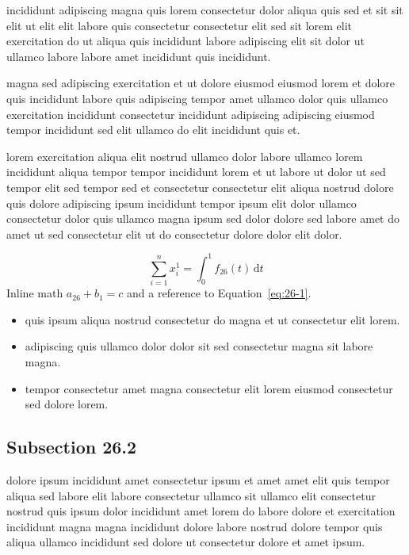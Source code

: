 \documentclass{article}
\begin{document}
incididunt adipiscing magna quis lorem consectetur dolor aliqua quis sed et sit sit elit ut elit elit labore quis consectetur consectetur elit sed sit lorem elit exercitation do ut aliqua quis incididunt labore adipiscing elit sit dolor ut ullamco labore labore amet incididunt quis incididunt.

magna sed adipiscing exercitation et ut dolore eiusmod eiusmod lorem et dolore quis incididunt labore quis adipiscing tempor amet ullamco dolor quis ullamco exercitation incididunt consectetur incididunt adipiscing adipiscing eiusmod tempor incididunt sed elit ullamco do elit incididunt quis et.

lorem exercitation aliqua elit nostrud ullamco dolor labore ullamco lorem incididunt aliqua tempor tempor incididunt lorem et ut labore ut dolor ut sed tempor elit sed tempor sed et consectetur consectetur elit aliqua nostrud dolore quis dolore adipiscing ipsum incididunt tempor ipsum elit dolor ullamco consectetur dolor quis ullamco magna ipsum sed dolor dolore sed labore amet do amet ut sed consectetur elit ut do consectetur dolore dolor elit dolor.

\begin{equation}\label{eq:26-1}
  \sum_{i=1}^{n} x_i^{1} = \int_0^1 f_{26}(t)\,\mathrm{d}t
\end{equation}
Inline math $a_{26} + b_{1} = c$ and a reference to Equation~\eqref{eq:26-1}.

\begin{itemize}
  \item quis ipsum aliqua nostrud consectetur do magna et ut consectetur elit lorem.
  \item adipiscing quis ullamco dolor dolor sit sed consectetur magna sit labore magna.
  \item tempor consectetur amet magna consectetur elit lorem eiusmod consectetur sed dolore lorem.
\end{itemize}

\subsection{Subsection 26.2}\label{sec:26-2}
dolore ipsum incididunt amet consectetur ipsum et amet amet elit quis tempor aliqua sed labore elit labore consectetur ullamco sit ullamco elit consectetur nostrud quis ipsum dolor incididunt amet lorem do labore dolore et exercitation incididunt magna magna incididunt dolore labore nostrud dolore tempor quis aliqua ullamco incididunt sed dolore ut consectetur dolore et amet ipsum.
\end{document}
